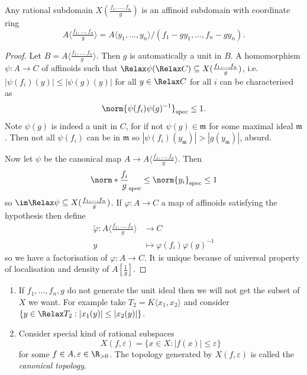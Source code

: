\documentclass[a4paper]{article}
\let\Sp\Relax
\DeclareMathOperator{\Sp}{Sp} %
\begin{document}
\begin{proposition}
  Any rational subdomain \(X(\tfrac{f_1, \dots, f_n}{g})\) is an affinoid subdomain with coordinate ring
  \[
    A \langle \tfrac{f_1, \dots, f_n}{g} \rangle = A \langle y_1, \dots, y_n \rangle/(f_1 - gy_1, \dots, f_n - gy_n).
  \]
\end{proposition}

\begin{proof}
  Let \(B = A \langle \tfrac{f_1, \dots, f_n}{g} \rangle\). Then \(g\) is automatically a unit in \(B\). A homomorphism \(\psi: A \to C\) of affinoids such that \(\Sp \psi(\Sp C) \subseteq X(\tfrac{f_1, \dots, f_n}{g})\), i.e.\ \(|\psi(f_i)(y)| \leq |\psi(g)(y)|\) for all \(y \in \Sp C\) for all \(i\) can be characterised as
  \[
    \norm{\psi(f_i) \psi(g)^{-1}}_{\mathrm{spec}} \leq 1.
  \]
  Note \(\psi(g)\) is indeed a unit in \(C\), for if not \(\psi(g) \in \mathfrak m\) for some maximal ideal \(\mathfrak m\). Then not all \(\psi(f_i)\) can be in \(\mathfrak m\) so \(|\psi(f_i)(y_{\mathfrak m})| > |g(y_{\mathfrak m})|\), absurd.

  Now let \(\psi\) be the canonical map \(A \to A\langle \tfrac{f_1, \dots, f_n}{g}\rangle\). Then
  \[
    \norm*{\frac{f_i}{g}}_{\mathrm{spec}} \leq \norm{y_i}_{\mathrm{spec}} \leq 1
  \]
  so \(\im \Sp \psi \subseteq X(\tfrac{f_1, \dots, f_n}{g})\). If \(\varphi: A \to C\) a map of affinoids satisfying the hypothesis then define
  \begin{align*}
    \tilde \varphi: A\langle \tfrac{f_1, \dots, f_n}{g} \rangle & \to C \\
    y &\mapsto \varphi(f_i) \varphi(g)^{-1}
  \end{align*}
  so we have a factorisation of \(\varphi: A \to C\). It is unique because of universal property of localisation and density of \(A[\frac{1}{g}]\).
\end{proof}

\begin{remark}\leavevmode
  \begin{enumerate}
  \item If \(f_1, \dots, f_n, g\) do not generate the unit ideal then we will not get the subset of \(X\) we want. For example take \(T_2 = K\langle x_1, x_2\rangle\) and consider \(\{y \in \Sp T_2: |x_1(y)| \leq |x_2(y)|\}\).
  \item Consider special kind of rational subspaces
    \[
      X(f, \varepsilon) = \{x \in X: |f(x)| \leq \varepsilon\}
    \]
    for some \(f \in A, \varepsilon \in \R_{> 0}\). The topology generated by \(X(f, \varepsilon)\) is called the \emph{canonical topology}.
  \end{enumerate}
\end{remark}
\end{document}
